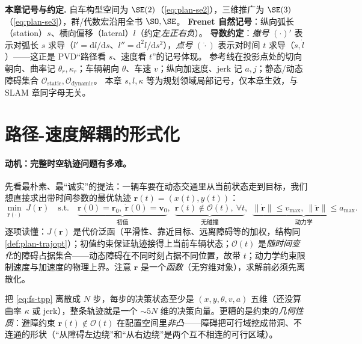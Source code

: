 \begin{note}
\textbf{本章记号与约定.}\;
自车构型空间为 $\SE(2)$（\cref{eq:plan-se2}），三维推广为 $\SE(3)$（\cref{eq:plan-se3}），群/代数宏沿用全书 $\SO,\SE$。
\textbf{Frenet 自然记号}：纵向弧长（station）$s$、横向偏移（lateral）$l$（约定\emph{左正右负}）。
\textbf{导数约定}：\emph{撇号} $(\cdot)'$ 表示对弧长 $s$ 求导（$l'=\mathrm{d}l/\mathrm{d}s$、$l''=\mathrm{d}^2l/\mathrm{d}s^2$），\emph{点号} $(\dot{\cdot})$ 表示对时间 $t$ 求导（$\dot s,\dot l$）——这正是 PVD“路径看 $s$、速度看 $t$”的记号体现。
参考线在投影点处的切向朝向、曲率记 $\theta_r,\kappa_r$；车辆朝向 $\theta$、车速 $v$；纵向加速度、jerk 记 $a,j$；静态/动态障碍集合 $\mathcal{O}_{\mathrm{static}},\mathcal{O}_{\mathrm{dynamic}}$。
本章 $s,l,\kappa$ 等为规划领域局部记号，仅本章生效，与 SLAM 章同字母无关。
\end{note}

\section{路径-速度解耦的形式化}
\label{sec:fs-pvd}

\paragraph{动机：完整时空轨迹问题有多难。}
先看最朴素、最“诚实”的提法：一辆车要在动态交通里从当前状态走到目标，我们想直接求出带时间参数的最优轨迹 $\mathbf{r}(t)=(x(t),y(t))$\cite{kant1986toward}：
\begin{equation}
  \min_{\mathbf{r}(\cdot)}\ J(\mathbf{r})\quad\text{s.t.}\quad
  \underbrace{\mathbf{r}(0)=\mathbf{r}_0,\ \dot{\mathbf{r}}(0)=\mathbf{v}_0}_{\text{初值}},\ \
  \underbrace{\mathbf{r}(t)\notin\mathcal{O}(t),\ \forall t}_{\text{无碰撞}},\ \
  \underbrace{\|\dot{\mathbf{r}}\|\le v_{\max},\ \|\ddot{\mathbf{r}}\|\le a_{\max}}_{\text{动力学}}.
  \label{eq:fs-tpp}
\end{equation}
逐项读懂：$J(\mathbf{r})$ 是代价泛函（平滑性、靠近目标、远离障碍等的加权，结构同 \cref{def:plan-trajopt}）；初值约束保证轨迹接得上当前车辆状态；$\mathcal{O}(t)$ 是\emph{随时间变化}的障碍占据集合——动态障碍在不同时刻占据不同位置，故带 $t$；动力学约束限制速度与加速度的物理上界。注意 $\mathbf{r}$ 是一个\emph{函数}（无穷维对象），求解前必须先离散化。

把 \cref{eq:fs-tpp} 离散成 $N$ 步，每步的决策状态至少是 $(x,y,\theta,v,a)$ 五维（还没算曲率 $\kappa$ 或 jerk），整条轨迹就是一个 $\sim5N$ 维的决策向量。更糟的是约束的\emph{几何性质}：避障约束 $\mathbf{r}(t)\notin\mathcal{O}(t)$ 在配置空间里\emph{非凸}——障碍把可行域挖成带洞、不连通的形状（“从障碍左边绕”和“从右边绕”是两个互不相连的可行区域）。

